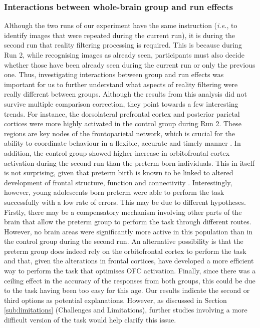 \subsubsection{Interactions between whole-brain group and run effects}
Although the two runs of our experiment have the same instruction (\textit{i.e.}, to identify images that were repeated during the current run), it is during the second run that reality filtering processing is required. This is because during Run 2, while recognising images as already seen, participants must also decide whether those have been already seen during the current run or only the previous one. Thus, investigating interactions between group and run effects was important for us to further understand what aspects of reality filtering were really different between groups. Although the results from this analysis did not survive multiple comparison correction, they point towards a few interesting trends. For instance, the dorsolateral prefrontal cortex and posterior parietal cortices were more highly activated in the control group during Run 2. These regions are key nodes of the frontoparietal network, which is crucial for the ability to coordinate behaviour in a flexible, accurate and timely manner \citep{Marek2018}. In addition, the control group showed higher increase in orbitofrontal cortex activation during the second run than the preterm-born individuals. This in itself is not surprising, given that preterm birth is known to be linked to altered development of frontal structure, function and connectivity \citep{Sripada2018}. Interestingly, however, young adolescents born preterm were able to perform the task successfully with a low rate of errors. This may be due to different hypotheses. Firstly, there may be a compensatory mechanism involving other parts of the brain that allow the preterm group to perform the task through different routes. However, no brain areas were significantly more active in this population than in the control group during the second run. An alternative possibility is that the preterm group does indeed rely on the orbitofrontal cortex to perform the task and that, given the alterations in frontal cortices, have developed a more efficient way to perform the task that optimises OFC activation. Finally, since there was a ceiling effect in the accuracy of the responses from both groups, this could be due to the task having been too easy for this age. Our results indicate the second or third options as potential explanations. However, as discussed in Section \ref{sub:limitations} (Challenges and Limitations), further studies involving a more difficult version of the task would help clarify this issue. 

